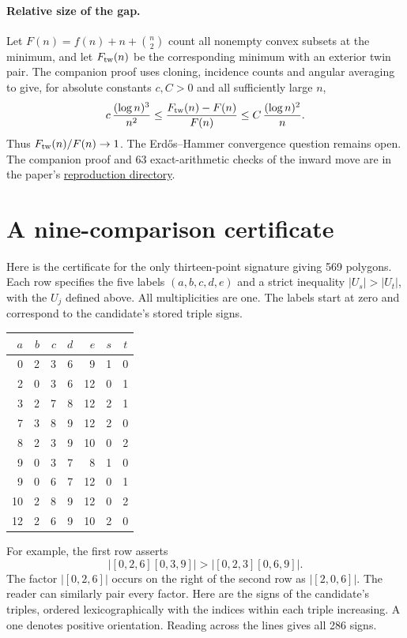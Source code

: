 \documentclass[11pt]{article}
\begin{document}
\paragraph{Relative size of the gap.}
Let $F(n)=f(n)+n+\binom n2$ count all nonempty convex subsets at the minimum, and let $F_{\rm tw}(n)$ be the corresponding minimum with an exterior twin pair. The companion proof uses cloning, incidence counts and angular averaging to give, for absolute constants $c,C>0$ and all sufficiently large $n$,
\[
 c\,\frac{(\log n)^3}{n^2}
 \le \frac{F_{\rm tw}(n)-F(n)}{F(n)}
 \le C\,\frac{(\log n)^2}{n}.
\]
Thus $F_{\rm tw}(n)/F(n)\to1$. The Erd\H{o}s--Hammer convergence question remains open. The companion proof and 63 exact-arithmetic checks of the inward move are in the paper's \href{https://github.com/rohanarun/erdos-838-convex-polygon-minima/tree/v1.2.0/reproduction/twin-gap}{reproduction directory}.

\newpage
\section*{A nine-comparison certificate}
Here is the certificate for the only thirteen-point signature giving 569 polygons. Each row specifies the five labels $(a,b,c,d,e)$ and a strict inequality $|U_s|>|U_t|$, with the $U_j$ defined above. All multiplicities are one. The labels start at zero and correspond to the candidate's stored triple signs.
\begin{center}
\begin{tabular}{rrrrr@{\hspace{1.8em}}cc}\toprule
$a$&$b$&$c$&$d$&$e$&$s$&$t$\\\midrule
0&2&3&6&9&1&0\\2&0&3&6&12&0&1\\3&2&7&8&12&2&1\\
7&3&8&9&12&2&0\\8&2&3&9&10&0&2\\9&0&3&7&8&1&0\\
9&0&6&7&12&0&1\\10&2&8&9&12&0&2\\12&2&6&9&10&2&0\\\bottomrule
\end{tabular}
\end{center}
For example, the first row asserts
\[
 |[0,2,6][0,3,9]|>|[0,2,3][0,6,9]|.
\]
The factor $|[0,2,6]|$ occurs on the right of the second row as $|[2,0,6]|$. The reader can similarly pair every factor. Here are the signs of the candidate's triples, ordered lexicographically with the indices within each triple increasing. A one denotes positive orientation. Reading across the lines gives all 286 signs.
\end{document}
